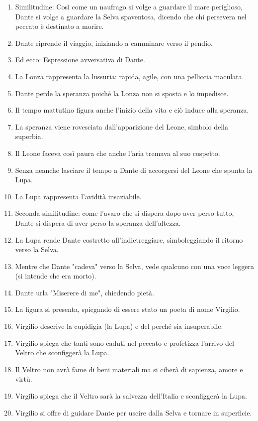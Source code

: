 \documentclass{article}
\begin{document}
\begin{enumerate}
    \item Similitudine: Così come un naufrago si volge a guardare il mare periglioso, Dante si volge a guardare la Selva spaventosa, dicendo che chi persevera nel peccato è destinato a morire.
    \item Dante riprende il viaggio, iniziando a camminare verso il pendio.
    \item Ed ecco: Espressione avversativa di Dante.
    \item La Lonza rappresenta la lussuria: rapida, agile, con una pelliccia maculata.
    \item Dante perde la speranza poiché la Lonza non si sposta e lo impedisce.
    \item Il tempo mattutino figura anche l'inizio della vita e ciò induce alla speranza.
    \item La speranza viene rovesciata dall'apparizione del Leone, simbolo della superbia.
    \item Il Leone faceva così paura che anche l'aria tremava al suo cospetto.
    \item Senza neanche lasciare il tempo a Dante di accorgersi del Leone che spunta la Lupa.
    \item La Lupa rappresenta l'avidità insaziabile.
    \item Seconda similitudine: come l'avaro che si dispera dopo aver perso tutto, Dante si dispera di aver perso la speranza dell'altezza.
    \item La Lupa rende Dante costretto all'indietreggiare, simboleggiando il ritorno verso la Selva.
    \item Mentre che Dante "cadeva" verso la Selva, vede qualcuno con una voce leggera (si intende che era morto).
    \item Dante urla "Miserere di me", chiedendo pietà.
    \item La figura si presenta, spiegando di essere stato un poeta di nome Virgilio.
    \item Virgilio descrive la cupidigia (la Lupa) e del perché sia insuperabile.
    \item Virgilio spiega che tanti sono caduti nel peccato e profetizza l'arrivo del Veltro che sconfiggerà la Lupa.
    \item Il Veltro non avrà fame di beni materiali ma si ciberà di sapienza, amore e virtù.
    \item Virgilio spiega che il Veltro sarà la salvezza dell'Italia e sconfiggerà la Lupa.
    \item Virgilio si offre di guidare Dante per uscire dalla Selva e tornare in superficie.

\end{enumerate}
\end{document}
